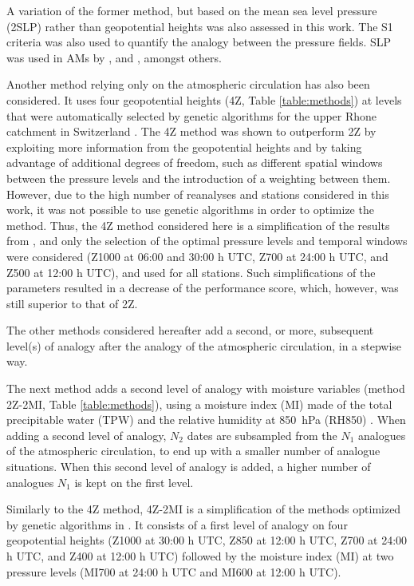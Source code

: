 \documentclass{ametsoc}
\begin{document}
A variation of the former method, but based on the mean sea level pressure (2SLP) rather than geopotential heights was also assessed in this work. The S1 criteria was also used to quantify the analogy between the pressure fields. SLP was used in AMs by \citet{Zorita1999}, \citet{Timbal2001a} and \citet{Martin2014b}, amongst others.

Another method relying only on the atmospheric circulation has also been considered. It uses four geopotential heights (4Z, Table \ref{table:methods}) at levels that were automatically selected by genetic algorithms for the upper Rhone catchment in Switzerland \citep{Horton2017b}. The 4Z method was shown to outperform 2Z by exploiting more information from the geopotential heights and by taking advantage of additional degrees of freedom, such as different spatial windows between the pressure levels and the introduction of a weighting between them. However, due to the high number of reanalyses and stations considered in this work, it was not possible to use genetic algorithms in order to optimize the method. Thus, the 4Z method considered here is a simplification of the results from \citet{Horton2017b}, and only the selection of the optimal pressure levels and temporal windows were considered (Z1000 at 06:00 and 30:00 h UTC, Z700 at 24:00 h UTC, and Z500 at 12:00 h UTC), and used for all stations. Such simplifications of the parameters resulted in a decrease of the performance score, which, however, was still superior to that of 2Z.

The other methods considered hereafter add a second, or more, subsequent level(s) of analogy after the analogy of the atmospheric circulation, in a stepwise way.

The next method adds a second level of analogy with moisture variables (method 2Z-2MI, Table \ref{table:methods}), using a moisture index (MI) made of the total precipitable water (TPW) and the relative humidity at 850~hPa (RH850) \citep{Bontron2004}. When adding a second level of analogy, $N_{2}$ dates are subsampled from the $N_{1}$ analogues of the atmospheric circulation, to end up with a smaller number of analogue situations. When this second level of analogy is added, a higher number of analogues $N_{1}$ is kept on the first level. 

Similarly to the 4Z method, 4Z-2MI is a simplification of the methods optimized by genetic algorithms in \citet{Horton2017b}. It consists of a first level of analogy on four geopotential heights (Z1000 at 30:00 h UTC, Z850 at 12:00 h UTC, Z700 at 24:00 h UTC, and Z400 at 12:00 h UTC) followed by the moisture index (MI) at two pressure levels (MI700 at 24:00 h UTC and MI600 at 12:00 h UTC).
\end{document}
